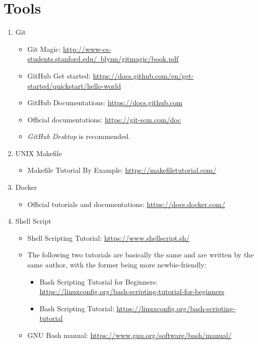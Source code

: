 \documentclass{article}
\begin{document}
\section{Tools}
\begin{enumerate}
    \item Git
    \begin{itemize}
        \item Git Magic:
        \href{http://www-cs-students.stanford.edu/~blynn/gitmagic/book.pdf}{http://www-cs-students.stanford.edu/~blynn/gitmagic/book.pdf}
        \item GitHub Get started:
        \href{https://docs.github.com/en/get-started/quickstart/hello-world}{https://docs.github.com/en/get-started/quickstart/hello-world}
        \item GitHub Documentations:
        \href{https://docs.github.com}{https://docs.github.com}
        \item Official documentations:
        \href{https://git-scm.com/doc}{https://git-scm.com/doc}
        \item \emph{GitHub Desktop} is recommended.
    \end{itemize}
    \item UNIX Makefile
    \begin{itemize}
        \item Makefile Tutorial By Example:
        \href{https://makefiletutorial.com/}{https://makefiletutorial.com/}
    \end{itemize}
    \item Docker
    \begin{itemize}
        \item Official tutorials and documentations:
        \href{https://docs.docker.com/}{https://docs.docker.com/}
    \end{itemize}
    \item Shell Script
    \begin{itemize}
        \item Shell Scripting Tutorial:
        \href{https://www.shellscript.sh/}{https://www.shellscript.sh/}
        \item The following two tutorials are basically the same and are written by the same author, with the former being more newbie-friendly:
        \begin{itemize}
            \item Bash Scripting Tutorial for Beginners:\\ \href{https://linuxconfig.org/bash-scripting-tutorial-for-beginners}{https://linuxconfig.org/bash-scripting-tutorial-for-beginners}
            \item Bash Scripting Tutorial: \href{https://linuxconfig.org/bash-scripting-tutorial}{https://linuxconfig.org/bash-scripting-tutorial}
        \end{itemize}
        \item GNU Bash manual: \href{https://www.gnu.org/software/bash/manual/}{https://www.gnu.org/software/bash/manual/}
    \end{itemize}
\end{enumerate}
\end{document}
